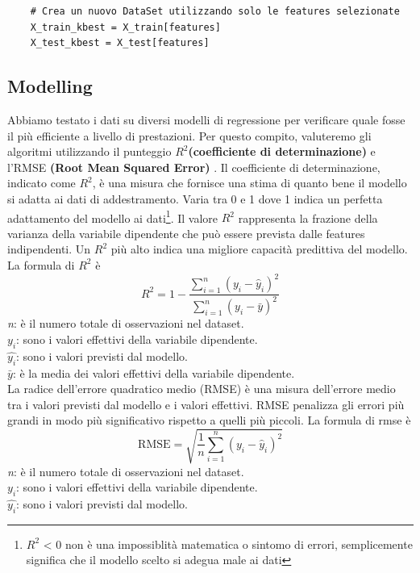 \documentclass{article}
\begin{document}
    
\begin{verbatim}
    # Crea un nuovo DataSet utilizzando solo le features selezionate
    X_train_kbest = X_train[features]
    X_test_kbest = X_test[features]
\end{verbatim}

\newpage
\subsection{Modelling}
Abbiamo testato i dati su diversi modelli di regressione per verificare quale fosse il più efficiente a livello di prestazioni. Per questo compito, valuteremo gli algoritmi utilizzando il punteggio $R^2$\textbf{(coefficiente di determinazione)} e l'RMSE \textbf{(Root Mean Squared Error)} .
Il coefficiente di determinazione, indicato come $R^2$, è una misura che fornisce una stima di quanto bene il modello si adatta ai dati di addestramento. Varia tra 0 e 1 dove 1 indica un perfetta adattamento del modello ai dati\footnote{$R^2$ < 0  non è una impossiblità matematica o sintomo di errori, semplicemente significa che il modello scelto si adegua male ai dati}. Il valore $R^2$ rappresenta la frazione della varianza della variabile dipendente che può essere prevista dalle features indipendenti. Un $R^2$ più alto indica una migliore capacità predittiva del modello. La formula di $R^2$ è \[ R^2 = 1 - \frac{\sum_{i=1}^{n}(y_i - \hat{y}_i)^2}{\sum_{i=1}^{n}(y_i - \bar{y})^2} \]
\textit{n}: è il numero totale di osservazioni nel dataset.\\
$y_i$: sono i valori effettivi della variabile dipendente.\\
$\hat{y_i}$: sono i valori previsti dal modello.\\
$\bar{y}$: è la media dei valori effettivi della variabile dipendente.\\

La radice dell'errore quadratico medio (RMSE) è una misura dell'errore medio tra i valori previsti dal modello e i valori effettivi. RMSE penalizza gli errori più grandi in modo più significativo rispetto a quelli più piccoli. La formula di rmse è
\[\text{RMSE} = \sqrt{\frac{1}{n} \sum_{i=1}^{n}(y_i - \hat{y}_i)^2}\]
\textit{n}: è il numero totale di osservazioni nel dataset.\\
$y_i$: sono i valori effettivi della variabile dipendente.\\
$\hat{y_i}$: sono i valori previsti dal modello.\\
\end{document}
